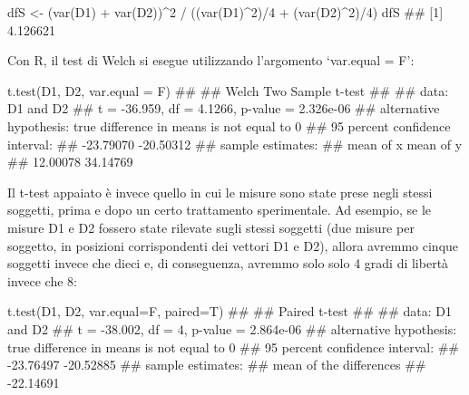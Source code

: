 \documentclass[a4paper,12pt,oneside]{book}
\newenvironment{Shaded}{\begin{snugshade}}{\end{snugshade}}
\newcommand{\DecValTok}[1]{#1}
\newcommand{\SpecialCharTok}[1]{#1}
\newcommand{\DocumentationTok}[1]{#1}
\newcommand{\OtherTok}[1]{#1}
\newcommand{\FunctionTok}[1]{#1}
\newcommand{\AttributeTok}[1]{#1}
\newcommand{\NormalTok}[1]{#1}
\begin{document}
\begin{Shaded}
\begin{Highlighting}[]
\NormalTok{dfS }\OtherTok{\textless{}{-}}\NormalTok{ (}\FunctionTok{var}\NormalTok{(D1) }\SpecialCharTok{+} \FunctionTok{var}\NormalTok{(D2))}\SpecialCharTok{\^{}}\DecValTok{2} \SpecialCharTok{/} 
\NormalTok{  ((}\FunctionTok{var}\NormalTok{(D1)}\SpecialCharTok{\^{}}\DecValTok{2}\NormalTok{)}\SpecialCharTok{/}\DecValTok{4} \SpecialCharTok{+}\NormalTok{ (}\FunctionTok{var}\NormalTok{(D2)}\SpecialCharTok{\^{}}\DecValTok{2}\NormalTok{)}\SpecialCharTok{/}\DecValTok{4}\NormalTok{)}
\NormalTok{dfS}
\DocumentationTok{\#\# [1] 4.126621}
\end{Highlighting}
\end{Shaded}

Con R, il test di Welch si esegue utilizzando l'argomento `var.equal = F':

\begin{Shaded}
\begin{Highlighting}[]
\FunctionTok{t.test}\NormalTok{(D1, D2, }\AttributeTok{var.equal =}\NormalTok{ F)}
\DocumentationTok{\#\# }
\DocumentationTok{\#\#  Welch Two Sample t{-}test}
\DocumentationTok{\#\# }
\DocumentationTok{\#\# data:  D1 and D2}
\DocumentationTok{\#\# t = {-}36.959, df = 4.1266, p{-}value = 2.326e{-}06}
\DocumentationTok{\#\# alternative hypothesis: true difference in means is not equal to 0}
\DocumentationTok{\#\# 95 percent confidence interval:}
\DocumentationTok{\#\#  {-}23.79070 {-}20.50312}
\DocumentationTok{\#\# sample estimates:}
\DocumentationTok{\#\# mean of x mean of y }
\DocumentationTok{\#\#  12.00078  34.14769}
\end{Highlighting}
\end{Shaded}

Il t-test appaiato è invece quello in cui le misure sono state prese negli stessi soggetti, prima e dopo un certo trattamento sperimentale. Ad esempio, se le misure D1 e D2 fossero state rilevate sugli stessi soggetti (due misure per soggetto, in posizioni corrispondenti dei vettori D1 e D2), allora avremmo cinque soggetti invece che dieci e, di conseguenza, avremmo solo solo 4 gradi di libertà invece che 8:

\begin{Shaded}
\begin{Highlighting}[]
\FunctionTok{t.test}\NormalTok{(D1, D2, }\AttributeTok{var.equal=}\NormalTok{F, }\AttributeTok{paired=}\NormalTok{T)}
\DocumentationTok{\#\# }
\DocumentationTok{\#\#  Paired t{-}test}
\DocumentationTok{\#\# }
\DocumentationTok{\#\# data:  D1 and D2}
\DocumentationTok{\#\# t = {-}38.002, df = 4, p{-}value = 2.864e{-}06}
\DocumentationTok{\#\# alternative hypothesis: true difference in means is not equal to 0}
\DocumentationTok{\#\# 95 percent confidence interval:}
\DocumentationTok{\#\#  {-}23.76497 {-}20.52885}
\DocumentationTok{\#\# sample estimates:}
\DocumentationTok{\#\# mean of the differences }
\DocumentationTok{\#\#               {-}22.14691}
\end{Highlighting}
\end{Shaded}
\end{document}
